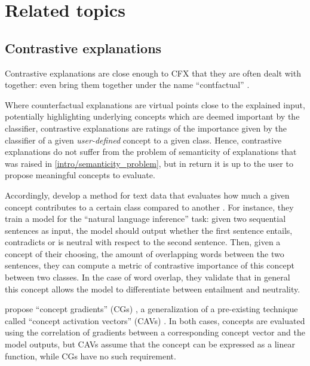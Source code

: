 \documentclass[../main.tex]{subfiles}
\begin{document}

\section{Related topics}

\subsection{Contrastive explanations}

Contrastive explanations are close enough to CFX that they are often dealt with together: \citeauthor{stepinSurvey2021} even bring them together under the name ``contfactual'' \cite{stepinSurvey2021}.

Where counterfactual explanations are virtual points close to the explained input, potentially highlighting underlying concepts which are deemed important by the classifier, contrastive explanations are ratings of the importance given by the classifier of a given \emph{user-defined} concept to a given class.
Hence, contrastive explanations do not suffer from the problem of semanticity of explanations that was raised in \autoref{intro/semanticity_problem}, but in return it is up to the user to propose meaningful concepts to evaluate.

Accordingly, \citeauthor{jacoviContrastive2021} develop a method for text data that evaluates how much a given concept contributes to a certain class compared to another \cite{jacoviContrastive2021}.
For instance, they train a model for the ``natural language inference'' task: given two sequential sentences as input, the model should output whether the first sentence entails, contradicts or is neutral with respect to the second sentence.
Then, given a concept of their choosing, \eg{} the amount of overlapping words between the two sentences, they can compute a metric of contrastive importance of this concept between two classes.
In the case of word overlap, they validate that in general this concept allows the model to differentiate between entailment and neutrality.

\citeauthor{baiConcept2022} propose ``concept gradients'' (CGs) \cite{baiConcept2022}, a generalization of a pre-existing technique called ``concept activation vectors'' (CAVs) \cite{kimInterpretability2018}.
In both cases, concepts are evaluated using the correlation of gradients between a corresponding concept vector and the model outputs, but CAVs assume that the concept can be expressed as a linear function, while CGs have no such requirement.
\end{document}

